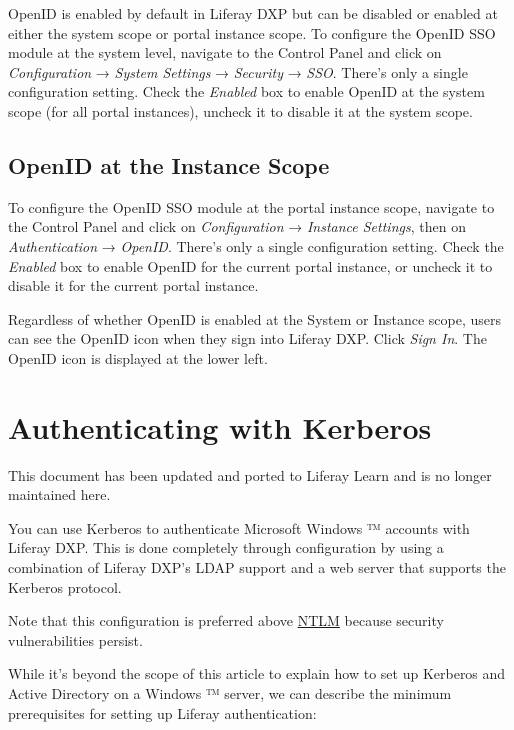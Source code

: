 OpenID is enabled by default in Liferay DXP but can be disabled or
enabled at either the system scope or portal instance scope. To
configure the OpenID SSO module at the system level, navigate to the
Control Panel and click on \emph{Configuration} → \emph{System Settings}
→ \emph{Security} → \emph{SSO}. There's only a single configuration
setting. Check the \emph{Enabled} box to enable OpenID at the system
scope (for all portal instances), uncheck it to disable it at the system
scope.

\section{OpenID at the Instance
Scope}\label{openid-at-the-instance-scope}

To configure the OpenID SSO module at the portal instance scope,
navigate to the Control Panel and click on \emph{Configuration} →
\emph{Instance Settings}, then on \emph{Authentication} → \emph{OpenID}.
There's only a single configuration setting. Check the \emph{Enabled}
box to enable OpenID for the current portal instance, or uncheck it to
disable it for the current portal instance.

Regardless of whether OpenID is enabled at the System or Instance scope,
users can see the OpenID icon when they sign into Liferay DXP. Click
\emph{Sign In}. The OpenID icon is displayed at the lower left.

\chapter{Authenticating with
Kerberos}\label{authenticating-with-kerberos}

{This document has been updated and ported to Liferay Learn and is no
longer maintained here.}

You can use Kerberos to authenticate Microsoft Windows ™ accounts with
Liferay DXP. This is done completely through configuration by using a
combination of Liferay DXP's LDAP support and a web server that supports
the Kerberos protocol.

Note that this configuration is preferred above
\href{/docs/7-1/deploy/-/knowledge_base/d/ntlm-single-sign-on-authentication}{NTLM}
because security vulnerabilities persist.

While it's beyond the scope of this article to explain how to set up
Kerberos and Active Directory on a Windows ™ server, we can describe the
minimum prerequisites for setting up Liferay authentication:


